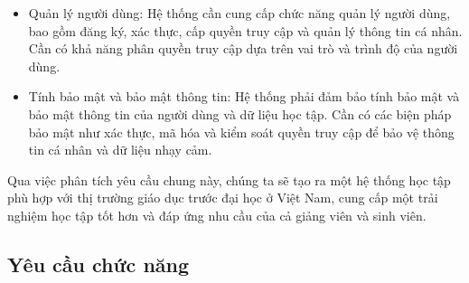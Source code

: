 \documentclass[../Thesis.tex]{subfiles}
\begin{document}
\begin{itemize}[label=$\bullet$]
            \item Quản lý người dùng:
            Hệ thống cần cung cấp chức năng quản lý người dùng, bao gồm đăng ký, xác thực, cấp quyền truy cập và quản lý thông tin cá nhân.
            Cần có khả năng phân quyền truy cập dựa trên vai trò và trình độ của người dùng.
            
            \item Tính bảo mật và bảo mật thông tin:
            Hệ thống phải đảm bảo tính bảo mật và bảo mật thông tin của người dùng và dữ liệu học tập.
            Cần có các biện pháp bảo mật như xác thực, mã hóa và kiểm soát quyền truy cập để bảo vệ thông tin cá nhân và dữ liệu nhạy cảm.
        \end{itemize}

        Qua việc phân tích yêu cầu chung này, chúng ta sẽ tạo ra một hệ thống học tập phù hợp với thị trường giáo dục trước đại học ở Việt Nam, cung cấp một trải nghiệm học tập tốt hơn và đáp ứng nhu cầu của cả giảng viên và sinh viên.  
    
    \subsection{Yêu cầu chức năng}
    \renewcommand{\thesubsubsection}{\alph{subsubsection}.}
\end{document}

